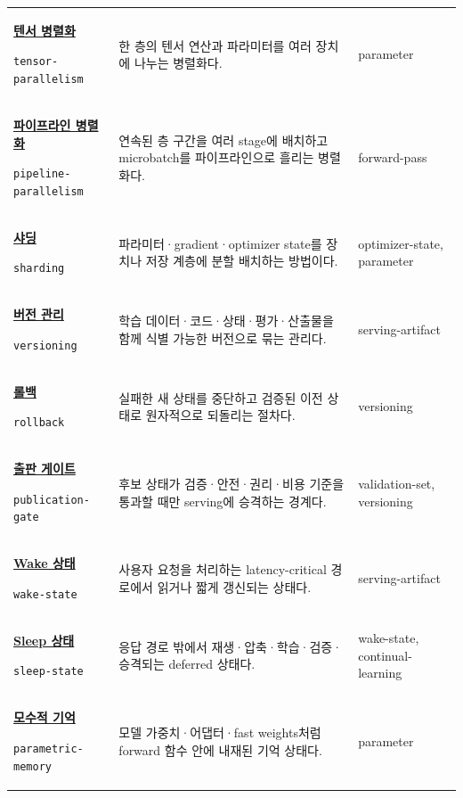 \begin{longtable}{p{} p{} p{}}
\hypertarget{glossary:tensor-parallelism}{\hyperref[bg:tensor-parallelism]{\textbf{텐서 병렬화}}} \newline\texttt{tensor-parallelism} & 한 층의 텐서 연산과 파라미터를 여러 장치에 나누는 병렬화다. & \scriptsize parameter \\
\hypertarget{glossary:pipeline-parallelism}{\hyperref[bg:pipeline-parallelism]{\textbf{파이프라인 병렬화}}} \newline\texttt{pipeline-parallelism} & 연속된 층 구간을 여러 stage에 배치하고 microbatch를 파이프라인으로 흘리는 병렬화다. & \scriptsize forward-pass \\
\hypertarget{glossary:sharding}{\hyperref[bg:sharding]{\textbf{샤딩}}} \newline\texttt{sharding} & 파라미터·gradient·optimizer state를 장치나 저장 계층에 분할 배치하는 방법이다. & \scriptsize optimizer-state, parameter \\
\hypertarget{glossary:versioning}{\hyperref[bg:versioning]{\textbf{버전 관리}}} \newline\texttt{versioning} & 학습 데이터·코드·상태·평가·산출물을 함께 식별 가능한 버전으로 묶는 관리다. & \scriptsize serving-artifact \\
\hypertarget{glossary:rollback}{\hyperref[bg:rollback]{\textbf{롤백}}} \newline\texttt{rollback} & 실패한 새 상태를 중단하고 검증된 이전 상태로 원자적으로 되돌리는 절차다. & \scriptsize versioning \\
\hypertarget{glossary:publication-gate}{\hyperref[bg:publication-gate]{\textbf{출판 게이트}}} \newline\texttt{publication-gate} & 후보 상태가 검증·안전·권리·비용 기준을 통과할 때만 serving에 승격하는 경계다. & \scriptsize validation-set, versioning \\
\hypertarget{glossary:wake-state}{\hyperref[bg:wake-state]{\textbf{Wake 상태}}} \newline\texttt{wake-state} & 사용자 요청을 처리하는 latency-critical 경로에서 읽거나 짧게 갱신되는 상태다. & \scriptsize serving-artifact \\
\hypertarget{glossary:sleep-state}{\hyperref[bg:sleep-state]{\textbf{Sleep 상태}}} \newline\texttt{sleep-state} & 응답 경로 밖에서 재생·압축·학습·검증·승격되는 deferred 상태다. & \scriptsize wake-state, continual-learning \\
\hypertarget{glossary:parametric-memory}{\hyperref[bg:parametric-memory]{\textbf{모수적 기억}}} \newline\texttt{parametric-memory} & 모델 가중치·어댑터·fast weights처럼 forward 함수 안에 내재된 기억 상태다. & \scriptsize parameter \\

\end{longtable}
